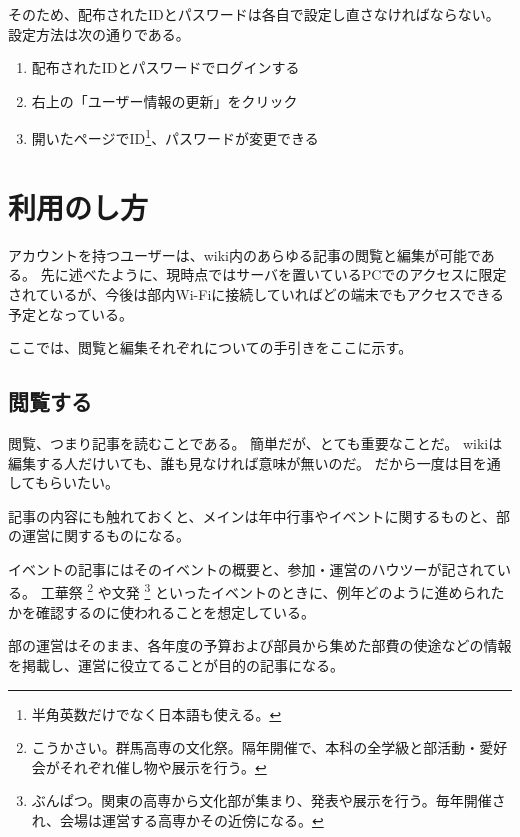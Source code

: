 \documentclass[lualatex,ja=standard,12pt,a4j]{bxjsbook}
\begin{document}
                そのため、配布されたIDとパスワードは各自で設定し直さなければならない。
                設定方法は次の通りである。
                
                \begin{enumerate}
                	\item 配布されたIDとパスワードでログインする
                    \item 右上の「ユーザー情報の更新」をクリック
                    \item 開いたページでID\footnote{半角英数だけでなく日本語も使える。}、パスワードが変更できる
                \end{enumerate}
                
		\section{利用のし方}
        	アカウントを持つユーザーは、wiki内のあらゆる記事の閲覧と編集が可能である。
            先に述べたように、現時点ではサーバを置いているPCでのアクセスに限定されているが、今後は部内Wi-Fiに接続していればどの端末でもアクセスできる予定となっている。
            
            ここでは、閲覧と編集それぞれについての手引きをここに示す。
            
            \subsection{閲覧する}
            	閲覧、つまり記事を読むことである。
                簡単だが、とても重要なことだ。
                wikiは編集する人だけいても、誰も見なければ意味が無いのだ。
                だから一度は目を通してもらいたい。
                
                記事の内容にも触れておくと、メインは年中行事やイベントに関するものと、部の運営に関するものになる。
                
                イベントの記事にはそのイベントの概要と、参加・運営のハウツーが記されている。
                工華祭
                \footnote{こうかさい。群馬高専の文化祭。隔年開催で、本科の全学級と部活動・愛好会がそれぞれ催し物や展示を行う。}
                や文発
                \footnote{ぶんぱつ。関東の高専から文化部が集まり、発表や展示を行う。毎年開催され、会場は運営する高専かその近傍になる。}
                といったイベントのときに、例年どのように進められたかを確認するのに使われることを想定している。
                
                部の運営はそのまま、各年度の予算および部員から集めた部費の使途などの情報を掲載し、運営に役立てることが目的の記事になる。
                
\end{document}
